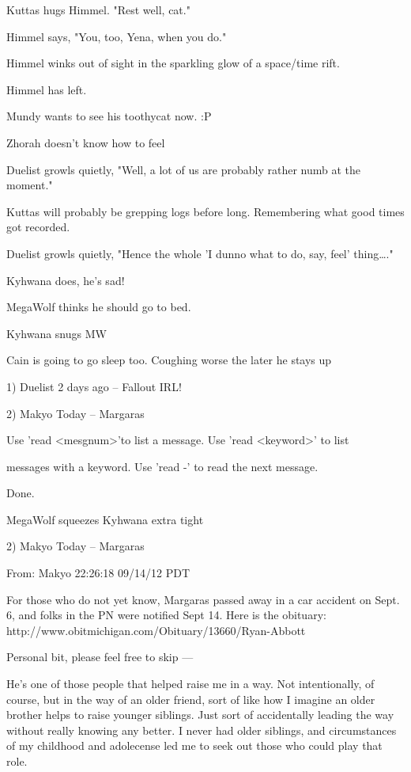 Kuttas hugs Himmel. "Rest well, cat."

Himmel says, "You, too, Yena, when you do."

Himmel winks out of sight in the sparkling glow of a space/time rift.

Himmel has left.

Mundy wants to see his toothycat now. :P

Zhorah doesn't know how to feel

Duelist growls quietly, "Well, a lot of us are probably rather numb at the moment."

Kuttas will probably be grepping logs before long. Remembering what good times got recorded.

Duelist growls quietly, "Hence the whole 'I dunno what to do, say, feel' thing\ldots{}."

Kyhwana does, he's sad!

MegaWolf thinks he should go to bed.

Kyhwana snugs MW

Cain is going to go sleep too. Coughing worse the later he stays up

1) Duelist  2 days ago -- Fallout IRL!

2) Makyo  Today -- Margaras

Use 'read <mesgnum>'to list a message.  Use 'read <keyword>' to list

messages with a keyword.  Use 'read -' to read the next message.

Done.

MegaWolf squeezes Kyhwana extra tight

2) Makyo  Today -- Margaras

From: Makyo  22:26:18 09/14/12 PDT

\noindent For those who do not yet know, Margaras passed away in a car accident on Sept. 6, and folks in the PN were notified Sept 14.  Here is the obituary: http://www.obitmichigan.com/Obituary/13660/Ryan-Abbott

Personal bit, please feel free to skip ---

He's one of those people that helped raise me in a way.  Not intentionally, of course, but in the way of an older friend, sort of like how I imagine an older brother helps to raise younger siblings.  Just sort of accidentally leading the way without really knowing any better.  I never had older siblings, and circumstances of my childhood and adolecense led me to seek out those who could play that role.

